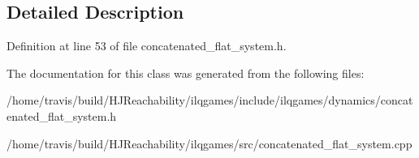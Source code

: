 \subsection{Detailed Description}


Definition at line 53 of file concatenated\+\_\+flat\+\_\+system.\+h.



The documentation for this class was generated from the following files\+:\begin{DoxyCompactItemize}
\item 
/home/travis/build/\+H\+J\+Reachability/ilqgames/include/ilqgames/dynamics/concatenated\+\_\+flat\+\_\+system.\+h\item 
/home/travis/build/\+H\+J\+Reachability/ilqgames/src/concatenated\+\_\+flat\+\_\+system.\+cpp\end{DoxyCompactItemize}

